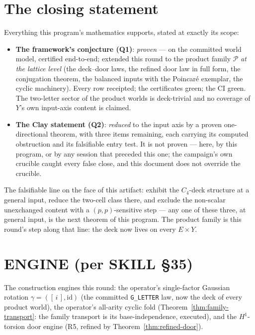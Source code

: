 \documentclass[11pt]{article}
\begin{document}
\section*{The closing statement}

Everything this program's mathematics supports, stated at exactly its
scope:

\begin{itemize}
\item \textbf{The framework's conjecture (Q1)}: \emph{proven} --- on the
committed world model, certified end-to-end; extended this round to the
product family $\mathcal P$ \emph{at the lattice level} (the deck--door laws,
the refined door law in full form, the conjugation theorem, the balanced
inputs with the Poincaré exemplar, the cyclic machinery). Every row
receipted; the certificates green; the CI green. The two-letter sector of
the product worlds is deck-trivial and no coverage of $Y$'s own
input-axis content is claimed.
\item \textbf{The Clay statement (Q2)}: \emph{reduced} to the input axis
by a proven one-directional theorem, with three items remaining, each
carrying its computed obstruction and its falsifiable entry test. It is
not proven --- here, by this program, or by any session that preceded this
one; the campaign's own crucible caught every false close, and this
document does not override the crucible.
\end{itemize}

The falsifiable line on the face of this artifact: exhibit the $C_4$-deck
structure at a general input, reduce the two-cell class there, and
exclude the non-scalar unexchanged content with a $(p,p)$-sensitive step
--- any one of these three, at general input, is the next theorem of this
program. The product family is this round's step along that line: the
deck now lives on every $E\times Y$.

\section*{ENGINE (per SKILL §35)}

The construction engines this round: the operator's single-factor Gaussian
rotation $\gamma=( [\,i\,],\mathrm{id})$ (the committed
\texttt{G\_LETTER} law, now the deck of every product world), the
operator's all-arity cyclic fold (Theorem~\ref{thm:family-transport}: the
family transport is its base-independence, executed), and the
$H^1$-torsion door engine (R5, refined by
Theorem~\ref{thm:refined-door}).
\end{document}
